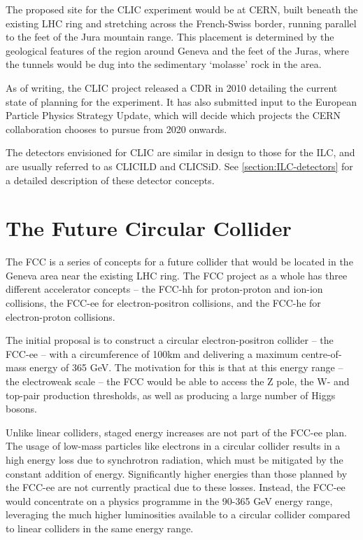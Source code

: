 The proposed site for the \acrshort{CLIC} experiment would be at \acrshort{CERN}, built beneath the existing \acrshort{LHC} ring and stretching across the French-Swiss border, running parallel to the feet of the Jura mountain range. This placement is determined by the geological features of the region around Geneva and the feet of the Juras, where the tunnels would be dug into the sedimentary `molasse' rock in the area. 

As of writing, the \acrshort{CLIC} project released a \acrfull{CDR} in 2010 detailing the current state of planning for the experiment. It has also submitted input to the European Particle Physics Strategy Update, which will decide which projects the \acrshort{CERN} collaboration chooses to pursue from 2020 onwards.

The detectors envisioned for \acrshort{CLIC} are similar in design to those for the \acrshort{ILC}, and are usually referred to as CLIC\textunderscore ILD and CLIC\textunderscore SiD. See \ref{section:ILC-detectors} for a detailed description of these detector concepts.

\section{The Future Circular Collider}
The \acrfull{FCC} is a series of concepts for a future collider that would be located in the Geneva area near the existing LHC ring. The \acrshort{FCC} project as a whole has three different accelerator concepts -- the FCC-hh for proton-proton and ion-ion collisions, the FCC-ee for electron-positron collisions, and the FCC-he for electron-proton collisions.

The initial proposal is to construct a circular electron-positron collider -- the FCC-ee -- with a circumference of 100km and delivering a maximum centre-of-mass energy of 365 GeV. The motivation for this is that at this energy range -- the electroweak scale -- the \acrshort{FCC} would be able to access the Z pole, the W- and top-pair production thresholds, as well as producing a large number of Higgs bosons. 

Unlike linear colliders, staged energy increases are not part of the FCC-ee plan. The usage of low-mass particles like electrons in a circular collider results in a high energy loss due to synchrotron radiation, which must be mitigated by the constant addition of energy. Significantly higher energies than those planned by the FCC-ee are not currently practical due to these losses. Instead, the FCC-ee would concentrate on a physics programme in the 90-365 GeV energy range, leveraging the much higher luminosities available to a circular collider compared to linear colliders in the same energy range.

